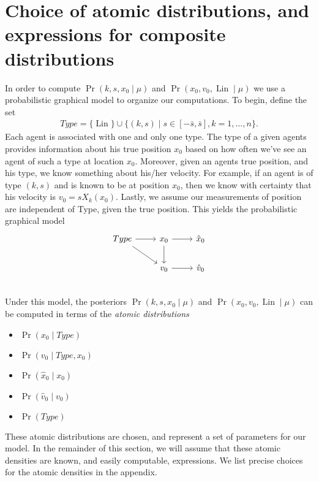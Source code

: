 \documentclass[12pt]{amsart}
\DeclareMathOperator{\Lin}{Lin}
\begin{document}
\section{Choice of atomic distributions, and expressions for composite distributions}
In order to compute $\Pr( k,s,x_0 \mid \mu)$ and $\Pr( x_0, v_0, \Lin \mid \mu)$ we use a probabilistic graphical model to organize our computations.
To begin, define the set
\begin{align*}
	Type = \{ \Lin \} \cup \{ (k,s) \mid s \in [-\bar{s}, \bar{s}] , k = 1,\dots,n\}.
\end{align*}
Each agent is associated with one and only one type.
The type of a given agents provides information about his true position $x_0$ based on how often we've see an agent of such a type at location $x_0$.
Moreover, given an agents true position, and his type, we know something about his/her velocity.
For example, if an agent is of type $(k,s)$ and is known to be at position $x_0$, then we know with certainty that his velocity is $v_0 = sX_k(x_0)$.
Lastly, we assume our measurements of position are independent of Type, given the true position.
This yields the probabilistic graphical model
\begin{equation}
\begin{tikzcd}
	Type \arrow[r] \arrow[rd] & x_0 \arrow[d] \arrow[r] & \hat{x}_0 \\
	 & v_0 \ar[r] & \hat{v}_0 \\
\end{tikzcd}
\label{eq:pgm}
\end{equation}
Under this model, the posteriors $\Pr( k,s,x_0 \mid \mu)$ and $\Pr( x_0, v_0, \Lin \mid \mu)$ can be computed in terms of the \emph{atomic distributions}
\begin{itemize}
	\item $\Pr( x_0 \mid Type )$
	\item $\Pr( v_0 \mid Type,x_0)$
	\item $\Pr( \hat{x}_0 \mid x_0)$
	\item $\Pr( \hat{v}_0 \mid v_0)$
	\item $\Pr(Type)$
\end{itemize}
These atomic distributions are chosen, and represent a set of parameters for our model.
In the remainder of this section, we will assume that these atomic densities are known, and easily computable, expressions.
We list precise choices for the atomic densities in the appendix.
\end{document}
